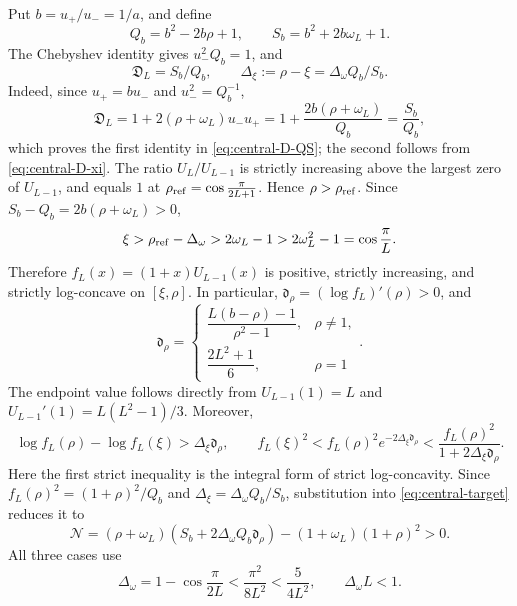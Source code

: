 \documentclass[11pt,a4paper]{article}
\numberwithin{equation}{section}
\begin{document}
Put \(b=u_+/u_-=1/a\), and define
\[
 Q_b=b^2-2b\rho+1,\qquad S_b=b^2+2b\omega_L+1.
\]
The Chebyshev identity gives \(u_-^2Q_b=1\), and
\begin{equation}\label{eq:central-D-QS}
 \mathfrak D_L=S_b/Q_b,\qquad
 \Delta_\xi:=\rho-\xi=\Delta_\omega Q_b/S_b.
\end{equation}
Indeed, since \(u_+=bu_-\) and \(u_-^2=Q_b^{-1}\),
\[
 \mathfrak D_L=1+2(\rho+\omega_L)u_-u_+
  =1+\frac{2b(\rho+\omega_L)}{Q_b}=\frac{S_b}{Q_b},
\]
which proves the first identity in \eqref{eq:central-D-QS}; the second
follows from
\eqref{eq:central-D-xi}.
The ratio \(U_L/U_{L-1}\) is strictly increasing above the largest zero
of \(U_{L-1}\), and equals \(1\) at
\(\rho_{\rm ref}=\cos\frac{\pi}{2L+1}\).  Hence
\(\rho>\rho_{\rm ref}\).  Since
\(S_b-Q_b=2b(\rho+\omega_L)>0\),
\[
 \xi>\rho_{\rm ref}-\Delta_\omega>2\omega_L-1
 >2\omega_L^2-1=\cos\frac{\pi}{L}.
\]
Therefore \(f_L(x)=(1+x)U_{L-1}(x)\) is positive, strictly increasing,
and strictly log-concave on \([\xi,\rho]\).  In particular,
\(\mathfrak d_\rho=(\log f_L)'(\rho)>0\), and
\[
 \mathfrak d_\rho=
 \begin{cases}
  \dfrac{L(b-\rho)-1}{\rho^2-1},&\rho\neq1,\\[6pt]
  \dfrac{2L^2+1}{6},&\rho=1
 \end{cases}.
\]
The endpoint value follows directly from \(U_{L-1}(1)=L\) and
\(U_{L-1}'(1)=L(L^2-1)/3\).  Moreover,
\[
 \log f_L(\rho)-\log f_L(\xi)>\Delta_\xi\mathfrak d_\rho,
 \qquad
 f_L(\xi)^2<f_L(\rho)^2e^{-2\Delta_\xi\mathfrak d_\rho}
 <\frac{f_L(\rho)^2}{1+2\Delta_\xi\mathfrak d_\rho}.
\]
Here the first strict inequality is the integral form of strict
log-concavity.  Since
\(f_L(\rho)^2=(1+\rho)^2/Q_b\) and
\(\Delta_\xi=\Delta_\omega Q_b/S_b\), substitution into
\eqref{eq:central-target} reduces it to
\begin{equation}\label{eq:N-positive-target}
 \mathcal N=(\rho+\omega_L)
 (S_b+2\Delta_\omega Q_b\mathfrak d_\rho)
 -(1+\omega_L)(1+\rho)^2>0.
\end{equation}
All three cases use
\begin{equation}\label{eq:Delta-omega-basic-bound}
 \Delta_\omega=1-\cos\frac{\pi}{2L}
 <\frac{\pi^2}{8L^2}<\frac5{4L^2},
 \qquad \Delta_\omega L<1.
\end{equation}
\end{document}
